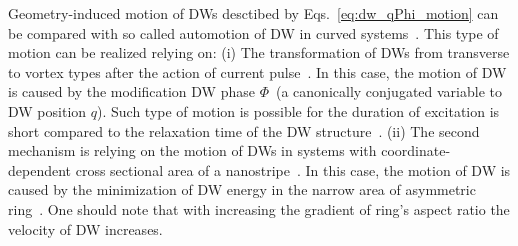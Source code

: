 Geometry-induced motion of DWs desctibed by Eqs.~\eqref{eq:dw_qPhi_motion} can be compared with so called automotion of DW in curved systems~\cite{Chauleau10,Richter16,Mawass17}. This type of motion can be realized relying on: (i) The transformation of DWs from transverse to vortex types after the action of current pulse~\cite{Chauleau10}. In this case, the motion of DW is caused by the modification DW phase $\Phi$~(a canonically conjugated variable to DW position $q$). Such type of motion is possible for the duration of excitation is short compared to the relaxation time of the DW structure~\cite{Chauleau10}. (ii) The second mechanism is relying on the motion of DWs in systems with coordinate-dependent cross sectional area of a nanostripe~\cite{Richter16,Mawass17}. In this case, the motion of DW is caused by the minimization of DW energy in the narrow area of asymmetric ring~\cite{Mawass17}. One should note that with increasing the gradient of ring's aspect ratio the velocity of DW increases.

